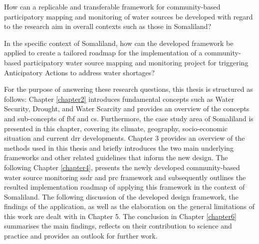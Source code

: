 \begin{questions}
    \item How can a replicable and transferable framework for community-based participatory mapping and monitoring of water sources be developed with regard to the research aim in overall contexts such as those in Somaliland?
    \item In the specific context of Somaliland, how can the developed framework be applied to create a tailored roadmap for the implementation of a community-based participatory water source mapping and monitoring project for triggering Anticipatory Actions to address water shortages?
\end{questions}

\noindent For the purpose of answering these research questions, this thesis is structured as follows: Chapter \ref{chapter2} introduces fundamental concepts such as Water Security, Drought, and Water Scarcity and provides an overview of the concepts and sub-concepts of \acrshort{fbf} and \acrshort{cs}. Furthermore, the case study area of Somaliland is presented in this chapter, covering its climate, geography, socio-economic situation and current \acrlong{drr} developments. Chapter 3 provides an overview of the methods used in this thesis and briefly introduces the two main underlying frameworks and other related guidelines that inform the new design. The following Chapter \ref{chapter4}, presents the newly developed community-based water source monitoring \acrfull{ssdr} and \acrfull{prc} framework and subsequently outlines the resulted implementation roadmap of applying this framework in the context of Somaliland. The following discussion of the developed design framework, the findings of the application, as well as the elaboration on the general limitations of this work are dealt with in Chapter 5. The conclusion in Chapter \ref{chapter6} summarises the main findings, reflects on their contribution to science and practice and provides an outlook for further work.
